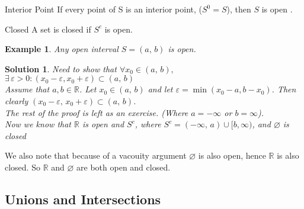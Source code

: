 \documentclass{article}
\newcommand{\R}{\mathbb{R}}
\newcommand{\sub}{\subset}
\newcommand{\e}{\varepsilon}
\newcommand{\ex}{\exists\,}
\newtheorem{example}{Example}
\newtheorem{solution}{Solution}
\begin{document}
\begin{definition}{Interior Point}{}
 If every point of S is an interior point, ($S^0 = S$), then $S$ is {\color{blue} open }.
\end{definition}\vspace{10pt}

\begin{definition}{Closed}
 A set is {\color{blue} closed } if $S^c$ is open.
\end{definition}\vspace{10pt}

\begin{example}{
 Any open interval $S= (a,\,b)$ is open.\\
}\end{example}\begin{solution}{
Need to show that $\displaystyle{\forall x_0\in(a,\, b), \:}$ $\displaystyle{\ex \e>0: (x_0 - \e, x_0+\e)\sub (a,\,b)}$\\
Assume that $\displaystyle{a, b \in \R}$. Let $\displaystyle{x_0\in(a,\,b)}$ and let $\e = \min (x_0 - a, b - x_0)$. Then clearly $\displaystyle{(x_0-\e,\, x_0+\e)\sub (a,\, b)}$. \\
The rest of the proof is left as an exercise. (Where $a = -\infty$ or $b=\infty$).\\
Now we know that $\R$ is open and $S^c$, where $S^c = (-\infty,\, a)\cup[b, \infty)$, and $\varnothing$ is closed
}\end{solution}\vspace{10pt}

We also note that because of a vacouity argument $\varnothing$ is also open, hence $\displaystyle{\R}$ is also closed. So $\displaystyle{\R}$ and $\displaystyle{\varnothing}$ are both open and closed.

\subsection{Unions and Intersections}
\end{document}
